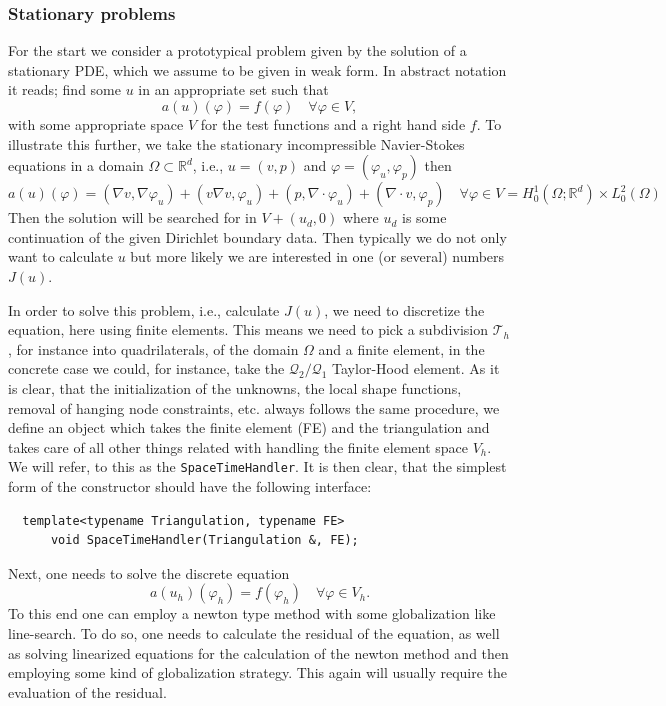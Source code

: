 \documentclass[prodmode,acmtoms]{acmsmall}
\numberwithin{equation}{section}
\newcommand{\R}{\mathbb{R}}
\renewcommand{\phi}{\varphi}
\begin{document}
\subsubsection{Stationary problems}
For the start we consider a prototypical problem given by the solution of 
a stationary PDE, which we assume to be given in weak form.
In abstract notation it reads; find some $u$ in an appropriate set 
such that
\[
a(u)(\phi) = f(\phi) \quad \forall \phi \in V,
\]
with some appropriate space $V$ for the test functions and a 
right hand side $f$.
To illustrate this further, we take the stationary 
incompressible Navier-Stokes equations in a domain $\Omega \subset \R^d$, 
i.e., $u = (v,p)$ and $\phi = (\phi_u,\phi_p)$ then
\[
a(u)(\phi) = (\nabla v, \nabla\phi_u) + (v \nabla v,\phi_u) + (p, \nabla \cdot \phi_u) + (\nabla \cdot v ,\phi_p)
\quad \forall \phi \in V = H^1_0(\Omega;\R^d) \times L^2_0(\Omega)
\]
Then the solution will be searched for in $V + (u_d,0)$ where $u_d$ is some 
continuation of the given Dirichlet boundary data.
Then typically we do not only want to calculate $u$ but more likely we are 
interested in one (or several) numbers $J(u)$. 

In order to solve this problem, i.e., calculate $J(u)$, we need to discretize 
the equation, here using finite elements. This means we need to pick a 
subdivision $\mathcal T_h$, for instance into quadrilaterals,
of the domain $\Omega$ and a finite element, in the concrete case we could, 
for instance, take the $\mathcal Q_2/\mathcal Q_1$ Taylor-Hood element.
As it is clear, that the initialization of the unknowns, the local shape 
functions, removal of hanging node constraints, etc. always follows the 
same procedure, we define an object which takes the finite element (FE)
and the triangulation and takes care of all other things related with 
handling the finite element space $V_h$. We will refer, to 
this as the \texttt{SpaceTimeHandler}. It is then clear, that the simplest 
form of the constructor should have the following interface:
\begin{lstlisting}
  template<typename Triangulation, typename FE>
      void SpaceTimeHandler(Triangulation &, FE);
\end{lstlisting}
Next, one needs to solve the discrete equation
\[
a(u_h)(\phi_h) = f(\phi_h) \quad \forall \phi \in V_h.
\]
To this end one can employ a newton type method with some globalization 
like line-search. To do so, one needs to calculate the residual of the 
equation, as well as solving linearized equations for the calculation of 
the newton method and then employing some kind of globalization strategy.
This again will usually require the evaluation of the residual.
\end{document}
